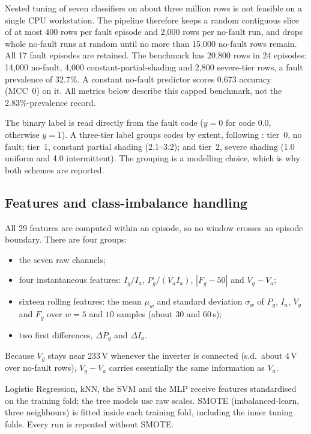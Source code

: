 \documentclass[11pt,a4paper]{article}
\begin{document}
Nested tuning of seven classifiers on about three million rows is not feasible on a single CPU workstation. The pipeline therefore keeps a random contiguous slice of at most 400 rows per fault episode and 2{,}000 rows per no-fault run, and drops whole no-fault runs at random until no more than 15{,}000 no-fault rows remain. All 17 fault episodes are retained. The benchmark has 20{,}800 rows in 24 episodes: 14{,}000 no-fault, 4{,}000 constant-partial-shading and 2{,}800 severe-tier rows, a fault prevalence of 32.7\%. A constant no-fault predictor scores 0.673 accuracy (MCC~0) on it. All metrics below describe this capped benchmark, not the 2.83\%-prevalence record.

The binary label is read directly from the fault code ($y=0$ for code 0.0, otherwise $y=1$). A three-tier label groups codes by extent, following \citet[Table~3]{Graillet2022}: tier~0, no fault; tier~1, constant partial shading (2.1--3.2); and tier~2, severe shading (1.0 uniform and 4.0 intermittent). The grouping is a modelling choice, which is why both schemes are reported.

\subsection{Features and class-imbalance handling}

All 29 features are computed within an episode, so no window crosses an episode boundary. There are four groups:
\begin{itemize}
\item the seven raw channels;
\item four instantaneous features: $I_g/I_a$, $P_g/(V_aI_a)$, $|F_g-50|$ and $V_g-V_a$;
\item sixteen rolling features: the mean $\mu_w$ and standard deviation $\sigma_w$ of $P_g$, $I_a$, $V_g$ and $F_g$ over $w=5$ and $10$ samples (about 30 and 60\,s);
\item two first differences, $\Delta P_g$ and $\Delta I_a$.
\end{itemize}
Because $V_g$ stays near 233\,V whenever the inverter is connected (s.d.\ about 4\,V over no-fault rows), $V_g-V_a$ carries essentially the same information as $V_a$.

Logistic Regression, kNN, the SVM and the MLP receive features standardised on the training fold; the tree models use raw scales. SMOTE (imbalanced-learn, three neighbours) is fitted inside each training fold, including the inner tuning folds. Every run is repeated without SMOTE.
\end{document}
